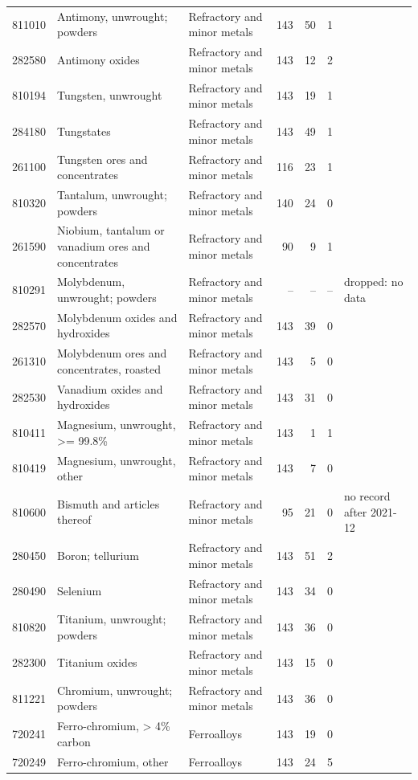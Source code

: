 \documentclass[10pt,a4paper]{article}
\begin{document}
\begin{minipage}{\linewidth}
\begin{tabular}{llp{3.2cm}rrrl}
811010 & Antimony, unwrought; powders & Refractory and minor metals & 143 & 50 & 1 &  \\
282580 & Antimony oxides & Refractory and minor metals & 143 & 12 & 2 &  \\
810194 & Tungsten, unwrought & Refractory and minor metals & 143 & 19 & 1 &  \\
284180 & Tungstates & Refractory and minor metals & 143 & 49 & 1 &  \\
261100 & Tungsten ores and concentrates & Refractory and minor metals & 116 & 23 & 1 &  \\
810320 & Tantalum, unwrought; powders & Refractory and minor metals & 140 & 24 & 0 &  \\
261590 & Niobium, tantalum or vanadium ores and concentrates & Refractory and minor metals & 90 & 9 & 1 &  \\
810291 & Molybdenum, unwrought; powders & Refractory and minor metals & -- & -- & -- & dropped: no data \\
282570 & Molybdenum oxides and hydroxides & Refractory and minor metals & 143 & 39 & 0 &  \\
261310 & Molybdenum ores and concentrates, roasted & Refractory and minor metals & 143 & 5 & 0 &  \\
282530 & Vanadium oxides and hydroxides & Refractory and minor metals & 143 & 31 & 0 &  \\
810411 & Magnesium, unwrought, >= 99.8\% & Refractory and minor metals & 143 & 1 & 1 &  \\
810419 & Magnesium, unwrought, other & Refractory and minor metals & 143 & 7 & 0 &  \\
810600 & Bismuth and articles thereof & Refractory and minor metals & 95 & 21 & 0 & no record after 2021-12 \\
280450 & Boron; tellurium & Refractory and minor metals & 143 & 51 & 2 &  \\
280490 & Selenium & Refractory and minor metals & 143 & 34 & 0 &  \\
810820 & Titanium, unwrought; powders & Refractory and minor metals & 143 & 36 & 0 &  \\
282300 & Titanium oxides & Refractory and minor metals & 143 & 15 & 0 &  \\
811221 & Chromium, unwrought; powders & Refractory and minor metals & 143 & 36 & 0 &  \\
720241 & Ferro-chromium, > 4\% carbon & Ferroalloys & 143 & 19 & 0 &  \\
720249 & Ferro-chromium, other & Ferroalloys & 143 & 24 & 5 &  \\

\end{tabular}
\end{minipage}
\end{document}
